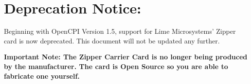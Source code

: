 \iffalse
This file is protected by Copyright. Please refer to the COPYRIGHT file
distributed with this source distribution.

This file is part of OpenCPI <http://www.opencpi.org>

OpenCPI is free software: you can redistribute it and/or modify it under the
terms of the GNU Lesser General Public License as published by the Free Software
Foundation, either version 3 of the License, or (at your option) any later
version.

OpenCPI is distributed in the hope that it will be useful, but WITHOUT ANY
WARRANTY; without even the implied warranty of MERCHANTABILITY or FITNESS FOR A
PARTICULAR PURPOSE. See the GNU Lesser General Public License for more details.

You should have received a copy of the GNU Lesser General Public License along
with this program. If not, see <http://www.gnu.org/licenses/>.
\fi

\def\docTitle{Zipper/Myriad-RF 1 Daughtercards}
\def\snippetpath{../../../../../../doc/av/tex/snippets}

\graphicspath{{figures/}}


\maketitle
\thispagestyle{empty}
\newpage

\section*{Deprecation Notice:}
Beginning with OpenCPI Version 1.5, support for Lime Microsystems' Zipper card is now deprecated. This document will not be updated any further.\\ \medskip

\textbf{Important Note: The Zipper Carrier Card is no longer being produced by the manufacturer. The card is Open Source so you are able to fabricate one yourself.}
